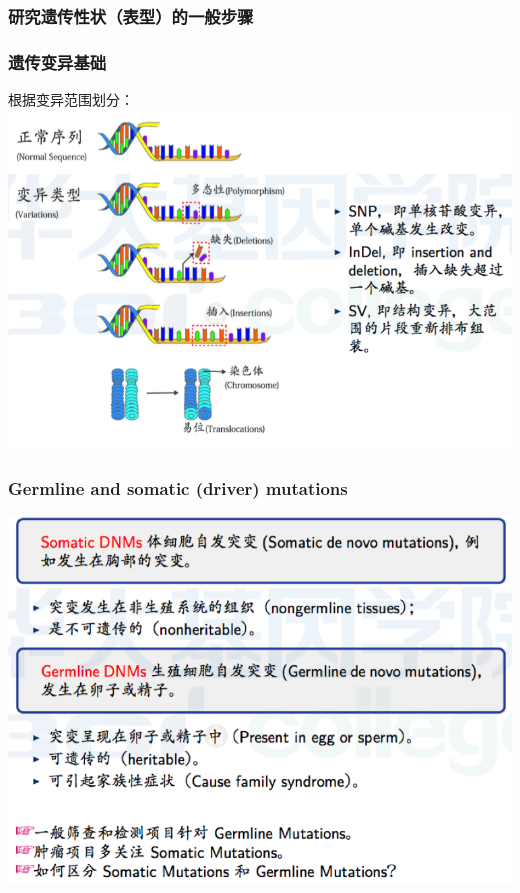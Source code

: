 \documentclass[12pt]{beamer}
\begin{document}
\begin{frame}\frametitle{研究遗传性状（表型）的一般步骤}
  \end{frame}

\begin{frame}\frametitle{遗传变异基础}
  根据变异范围划分：
  \includegraphics[width=\textwidth]{figures/old_slides/varbasic.png}
\end{frame}

\begin{frame}\frametitle{Germline and somatic (driver) mutations}
    \includegraphics[width=\textwidth]{figures/old_slides/vartype.png}
  \end{frame}
\end{document}
